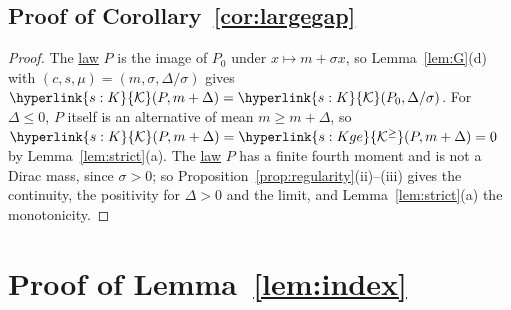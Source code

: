\documentclass[11pt]{article}
\newcommand{\sy}[2]{{\hyperlink{#1}{#2}}}
\newcommand{\term}[2]{\hyperlink{#1}{#2}}
\newcommand{\Kc}{\sy{s:K}{\mathcal{K}}}
\newcommand{\Kge}{\sy{s:Kge}{\mathcal{K}^{\ge}}}
\begin{document}
\subsection{Proof of Corollary~\ref{cor:largegap}}\label{sec:proof-cor-largegap}

\begin{proof}
The \term{w:law}{law} $P$ is the image of $P_0$ under $x\mapsto m+\sigma x$, so Lemma~\ref{lem:G}(d) with $(c,s,\mu)=(m,\sigma,\Delta/\sigma)$ gives
$\Kc(P,m+\Delta)=\Kc(P_0,\Delta/\sigma)$. For $\Delta\le0$, $P$ itself is an alternative of mean $m\ge m+\Delta$, so
$\Kc(P,m+\Delta)=\Kge(P,m+\Delta)=0$ by Lemma~\ref{lem:strict}(a). The \term{w:law}{law} $P$ has a finite fourth moment and is not
a Dirac mass, since $\sigma>0$; so Proposition~\ref{prop:regularity}(ii)--(iii) gives the continuity, the positivity for
$\Delta>0$ and the limit, and Lemma~\ref{lem:strict}(a) the monotonicity.
\end{proof}

\section{\texorpdfstring{Proof of Lemma~\ref{lem:index}}{Proof of Lemma 5.1}}\label{sec:proof-index}
\end{document}
